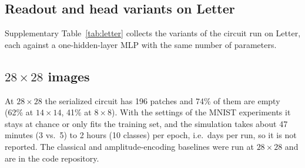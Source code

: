 \subsection{Readout and head variants on Letter}

Supplementary Table~\ref{tab:letter} collects the variants of the circuit run on Letter, each against a one-hidden-layer MLP with the same number of parameters.

\begin{table}[htbp]
  \centering
  \caption{Letter (26 classes): readout, head and depth variants of the circuit with coherent memory, against a one-hidden-layer MLP of the same size. Test accuracy (\%), mean $\pm$ standard deviation over three seeds; the better mean of each row is in bold. Gradient-boosted trees reach $95.3\pm0.1$.}
  \label{tab:letter}
  \footnotesize
  
\end{table}

\subsection{$28\times28$ images}
\label{sec:supp-28}

At $28\times28$ the serialized circuit has 196 patches and 74\% of them are empty (62\% at $14\times14$, 41\% at $8\times8$). With the settings of the MNIST experiments it stays at chance or only fits the training set, and the simulation takes about 47 minutes (3 vs.\ 5) to 2 hours (10 classes) per epoch, i.e.\ days per run, so it is not reported. The classical and amplitude-encoding baselines were run at $28\times28$ and are in the code repository.

